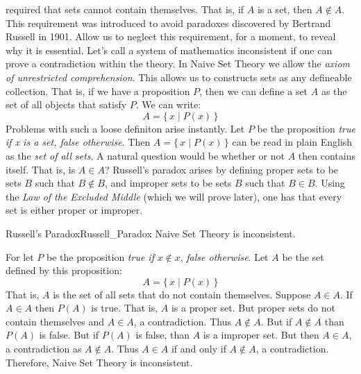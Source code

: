     required that sets cannot contain themselves. That is, if
    $A$ is a set, then $A\notin{A}$. This requirement was introduced to
    avoid paradoxes discovered by Bertrand Russell in 1901. Allow us to
    neglect this requirement, for a moment, to reveal why it is essential.
    Let's call a system of mathematics inconsistent if one can prove
    a contradiction within the theory. In Naive Set Theory we allow the
    \textit{axiom of unrestricted comprehension}. This allows us to
    constructs sets as any defineable collection. That is, if we have a
    proposition $P$, then we can define a set $A$ as the set of all objects
    that satisfy $P$. We can write:
    \begin{equation}
        A=\{\,x\;|\;P(x)\,\}
    \end{equation}
    Problems with such a loose definiton arise instantly. Let $P$ be the
    proposition \textit{true if x is a set, false otherwise}. Then
    $A=\{\,x\;|\;P(x)\,\}$ can be read in plain English as the
    \textit{set of all sets}. A natural question would be whether or not
    $A$ then contains itself. That is, is $A\in{A}$? Russell's paradox
    arises by defining proper sets to be sets $B$ such that $B\notin{B}$,
    and improper sets to be sets $B$ such that $B\in{B}$. Using the
    \textit{Law of the Excluded Middle} (which we will prove later), one
    has that every set is either proper or improper.
    \begin{ftheorem}{Russell's Paradox}{Russell_Paradox}
        Naive Set Theory is inconsistent.
    \end{ftheorem}
    \begin{bproof}
        For let $P$ be the proposition
        \textit{true if} $x\notin{x}$, \textit{false otherwise}.
        Let $A$ be the set defined by this proposition:
        \begin{equation}
            A=\{\,x\;|\;P(x)\,\}
        \end{equation}
        That is, $A$ is the set of all sets that do not contain themselves.
        Suppose $A\in{A}$. If $A\in{A}$ then $P(A)$ is true. That is, $A$ is a
        proper set. But proper sets do not contain themselves and $A\in{A}$, a
        contradiction. Thus $A\notin{A}$. But if $A\notin{A}$ than $P(A)$ is
        false. But if $P(A)$ is false, than $A$ is a improper set. But then
        $A\in{A}$, a contradiction as $A\notin{A}$. Thus $A\in{A}$ if and only
        if $A\notin{A}$, a contradiction. Therefore, Naive Set Theory is
        inconsistent.
    \end{bproof}
